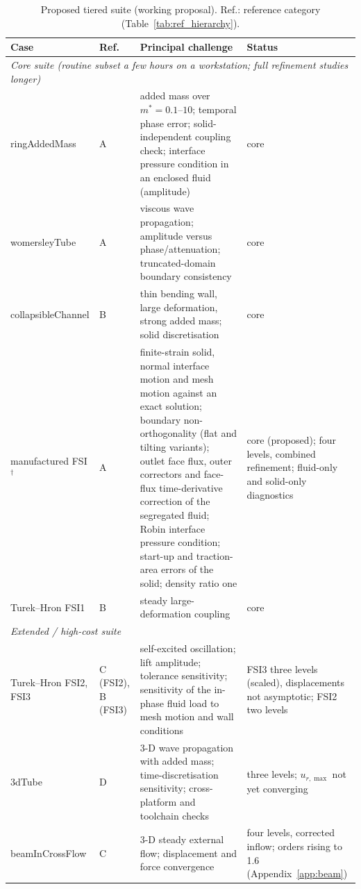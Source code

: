 \begin{table}[htbp]
	\centering
	\footnotesize
	\setlength{\tabcolsep}{3pt}
	\caption{Proposed tiered suite (working proposal). Ref.: reference category (Table~\ref{tab:ref_hierarchy}).}
	\label{tab:suite_tiers}
	\begin{tabular}{p{2.8cm}p{1.1cm}p{6.3cm}p{3.4cm}}
		\toprule
		Case & Ref. & Principal challenge & Status \\
		\midrule
		\multicolumn{4}{l}{\emph{Core suite (routine subset a few hours on a workstation; full refinement studies longer)}} \\
		ringAddedMass & A & added mass over $m^* = 0.1$--$10$; temporal phase error; solid-independent coupling check; interface pressure condition in an enclosed fluid (amplitude) & core \\
		womersleyTube & A & viscous wave propagation; amplitude versus phase/attenuation; truncated-domain boundary consistency & core \\
		collapsibleChannel & B & thin bending wall, large deformation, strong added mass; solid discretisation & core \\
		manufactured FSI$^\dagger$ & A & finite-strain solid, normal interface motion and mesh motion against an exact solution; boundary non-orthogonality (flat and tilting variants); outlet face flux, outer correctors and face-flux time-derivative correction of the segregated fluid; Robin interface pressure condition; start-up and traction-area errors of the solid; density ratio one & core (proposed); four levels, combined refinement; fluid-only and solid-only diagnostics \\
		Turek--Hron FSI1 & B & steady large-deformation coupling & core \\
		\midrule
		\multicolumn{4}{l}{\emph{Extended / high-cost suite}} \\
		Turek--Hron FSI2, FSI3 & C (FSI2), B (FSI3) & self-excited oscillation; lift amplitude; tolerance sensitivity; sensitivity of the in-phase fluid load to mesh motion and wall conditions & FSI3 three levels (scaled), displacements not asymptotic; FSI2 two levels \\
		3dTube & D & 3-D wave propagation with added mass; time-discretisation sensitivity; cross-platform and toolchain checks & three levels; $u_{r,\max}$ not yet converging \\
		beamInCrossFlow & C & 3-D steady external flow; displacement and force convergence & four levels, corrected inflow; orders rising to 1.6 (Appendix~\ref{app:beam}) \\

\end{tabular}
\end{table}
